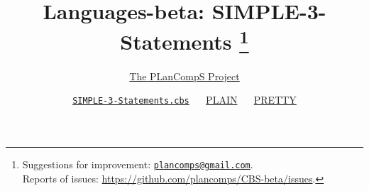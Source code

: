 \documentclass[fleqn]{article}
\title{Languages-beta: SIMPLE-3-Statements \footnote{
    Suggestions for improvement: \href{mailto:plancomps@gmail.com}{\texttt{plancomps@gmail.com}}.\\
    Reports of issues: \url{https://github.com/plancomps/CBS-beta/issues}.}}
\author{\href{https://plancomps.github.io}{The PLanCompS Project}}
\date{
  \href{https://github.com/plancomps/CBS-beta/blob/math/Languages-beta/SIMPLE/SIMPLE-cbs/SIMPLE/SIMPLE-3-Statements/SIMPLE-3-Statements.cbs}{\texttt{SIMPLE-3-Statements.cbs}} ~\textbar~
  \href{/CBS-beta/docs/Languages-beta/SIMPLE/SIMPLE-cbs/SIMPLE/SIMPLE-3-Statements/index.html}{PLAIN} ~\textbar~
  \href{/CBS-beta/math/Languages-beta/SIMPLE/SIMPLE-cbs/SIMPLE/SIMPLE-3-Statements/index.html}{PRETTY}          
}
\begin{document}
\maketitle
\makeatletter

\end{document}

